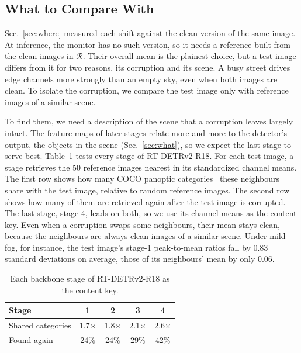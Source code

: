 \subsection{What to Compare With}
\label{sec:against}

Sec.~\ref{sec:where} measured each shift against the clean version of the same image. At inference, the monitor has no such version, so it needs a reference built from the clean images in $\mathcal{R}$. Their overall mean is the plainest choice, but a test image differs from it for two reasons, its corruption and its scene. A busy street drives edge channels more strongly than an empty sky, even when both images are clean. To isolate the corruption, we compare the test image only with reference images of a similar scene.

To find them, we need a description of the scene that a corruption leaves largely intact. The feature maps of later stages relate more and more to the detector's output, the objects in the scene (Sec.~\ref{sec:what}), so we expect the last stage to serve best. Table~\ref{tab:key} tests every stage of RT-DETRv2-R18. For each test image, a stage retrieves the 50 reference images nearest in its standardized channel means. The first row shows how many COCO panoptic categories~\cite{kirillov2019panoptic} these neighbours share with the test image, relative to random reference images. The second row shows how many of them are retrieved again after the test image is corrupted. The last stage, stage 4, leads on both, so we use its channel means as the content key. Even when a corruption swaps some neighbours, their mean stays clean, because the neighbours are always clean images of a similar scene. Under mild fog, for instance, the test image's stage-1 peak-to-mean ratios fall by 0.83 standard deviations on average, those of its neighbours' mean by only 0.06.

\begin{table}[!htb]
  \centering
  \caption{Each backbone stage of RT-DETRv2-R18 as the content key.}
  \label{tab:key}
  \begin{tabular}{lcccc}
    \toprule
    Stage & 1 & 2 & 3 & 4 \\
    \midrule
    Shared categories & 1.7$\times$ & 1.8$\times$ & 2.1$\times$ & 2.6$\times$ \\
    Found again & 24\% & 24\% & 29\% & 42\% \\
    \bottomrule
  \end{tabular}
\end{table}

